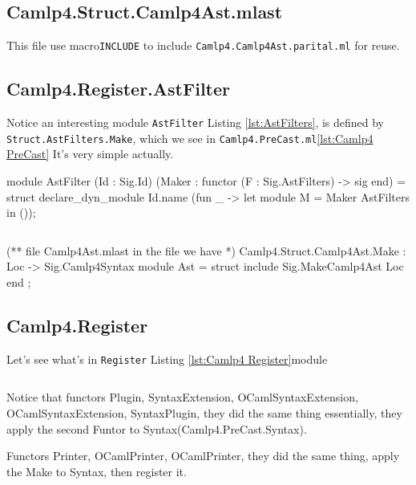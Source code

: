 \subsection{Camlp4.Struct.Camlp4Ast.mlast} 

This file use macro\verb|INCLUDE| to include
\verb|Camlp4.Camlp4Ast.parital.ml| for reuse.


\subsection{Camlp4.Register.AstFilter}    
Notice an interesting module \verb|AstFilter| Listing
\ref{lst:AstFilters}, is defined by \verb|Struct.AstFilters.Make|,
which we see in \verb|Camlp4.PreCast.ml|\ref{lst:Camlp4 PreCast} It's
very simple actually.

\begin{ocamlcode}
module AstFilter
  (Id : Sig.Id) (Maker : functor (F : Sig.AstFilters) -> sig end) =
struct
  declare_dyn_module Id.name (fun _ -> let module M = Maker AstFilters in ());
\end{ocamlcode}

\inputminted[fontsize=\scriptsize,]{ocaml}{code/camlp4/source/AstFilters.ml}



\begin{ocamlcode}
(** file Camlp4Ast.mlast   in the file we have *)
Camlp4.Struct.Camlp4Ast.Make : Loc -> Sig.Camlp4Syntax
  module Ast = struct
     include Sig.MakeCamlp4Ast Loc 
  end ;
\end{ocamlcode}


\subsection{Camlp4.Register}
Let's see what's in \verb|Register| Listing \ref{lst:Camlp4
  Register}module


\inputminted[fontsize=\scriptsize,
]{ocaml}{code/camlp4/source/Register.ml}

Notice that functors Plugin, SyntaxExtension, OCamlSyntaxExtension,
OCamlSyntaxExtension, SyntaxPlugin, they did the same thing
essentially, they apply the second Funtor to
Syntax(Camlp4.PreCast.Syntax).

Functors Printer, OCamlPrinter, OCamlPrinter, they did the same thing,
apply the Make to Syntax, then register it. 

